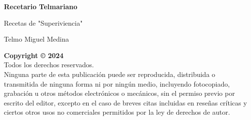 \begin{titlepage}
    \centering
    \vspace*{5cm}
    {\Huge\bfseries Recetario Telmariano\par}
    \vspace{1cm}
    {\Large Recetas de "Superiviencia"\par}
    \vspace{1.5cm}
    {\Large Telmo Miguel Medina\par}
    \vfill
    \vspace{1.5cm}
    \begin{center}
        \textbf{Copyright © 2024}\\
        Todos los derechos reservados.\\
        Ninguna parte de esta publicación puede ser reproducida, distribuida o transmitida de ninguna forma ni por ningún medio, incluyendo fotocopiado, grabación u otros métodos electrónicos o mecánicos, sin el permiso previo por escrito del editor, excepto en el caso de breves citas incluidas en reseñas críticas y ciertos otros usos no comerciales permitidos por la ley de derechos de autor.
    \end{center}
    \vfill
\end{titlepage}